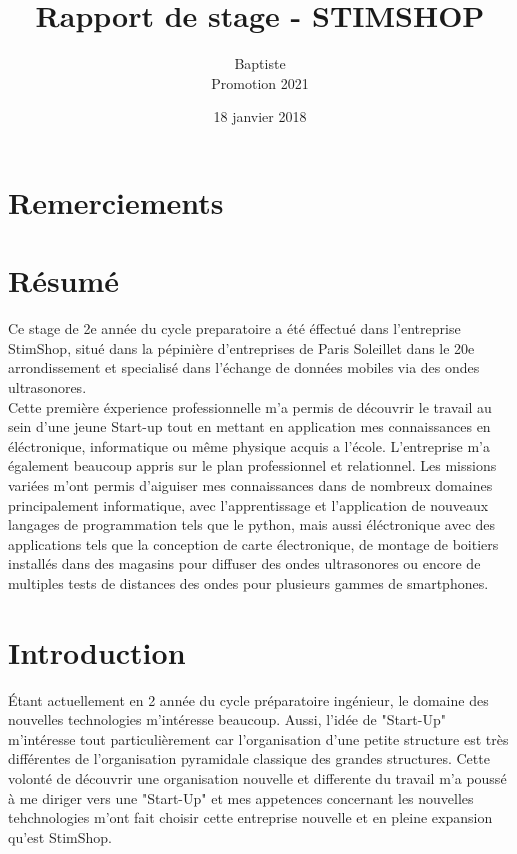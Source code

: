 \documentclass[12pt]{report}
\title{Rapport de stage - STIMSHOP}
\author{Baptiste \bsc{Pillet}\\Promotion 2021}
\date{18 janvier 2018}
\begin{document}
\maketitle


\chapter*{Remerciements}
\newpage
\chapter*{R\'{e}sum\'{e}}
Ce stage de 2e ann\'ee du cycle preparatoire a \'et\'e \'effectu\'e dans l'entreprise StimShop, situ\'e dans la p\'epini\`ere d'entreprises de Paris Soleillet dans le 20e arrondissement et specialis\'e dans l'\'echange de donn\'ees mobiles via des ondes ultrasonores. \\

Cette premi\`ere \'experience professionnelle m'a permis de d\'ecouvrir le travail au sein d'une jeune Start-up tout en mettant en application mes connaissances en \'el\'ectronique, informatique ou m\^eme physique acquis a l'\'ecole. L'entreprise m'a \'egalement beaucoup appris sur le plan professionnel et relationnel. Les missions vari\'ees m'ont permis d'aiguiser mes connaissances dans de nombreux domaines principalement informatique, avec l'apprentissage et l'application de nouveaux langages de programmation tels que le python, mais aussi \'el\'ectronique avec des applications tels que la conception de carte \'electronique, de montage de boitiers install\'es dans des magasins pour diffuser des ondes ultrasonores ou encore de multiples tests de distances des ondes pour plusieurs gammes de smartphones. 
\newpage


\renewcommand{\contentsname}{Sommaire}
\tableofcontents

\chapter*{Introduction}
\'Etant actuellement en 2\ieme{} ann\'ee du cycle pr\'eparatoire ing\'enieur, le domaine des nouvelles technologies m'int\'eresse beaucoup. Aussi, l'id\'ee de "Start-Up" m'int\'eresse tout particuli\`erement car l'organisation d'une petite structure est tr\`es diff\'erentes de l'organisation pyramidale classique des grandes structures. Cette volont\'e de d\'ecouvrir une organisation nouvelle et differente du travail m'a pouss\'e \`a me diriger vers une "Start-Up" et mes appetences concernant les nouvelles tehchnologies m'ont fait choisir cette entreprise nouvelle et en pleine expansion qu'est StimShop.\\
\end{document}
